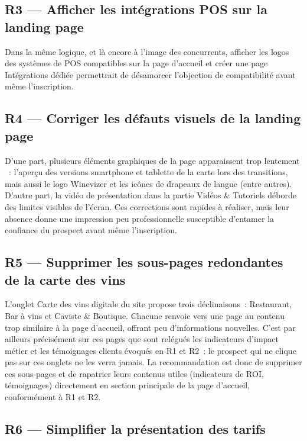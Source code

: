 \documentclass[12pt, a4paper]{article}
\begin{document}
\subsection{R3 — Afficher les intégrations POS sur la landing page}

Dans la même logique, et là encore à l'image des concurrents, afficher les logos des systèmes
de POS compatibles sur la page d'accueil et créer une page \og{}Intégrations\fg{} dédiée
permettrait de désamorcer l'objection de compatibilité avant même l'inscription.

\subsection{R4 — Corriger les défauts visuels de la landing page}

D'une part, plusieurs éléments graphiques de la page apparaissent trop lentement
~: l'aperçu des versions smartphone et tablette de la carte lors des
transitions, mais aussi le logo Winevizer et les icônes de drapeaux de langue (entre autres).
D'autre part, la vidéo de
présentation dans la partie \og{}Vidéos \& Tutoriels\fg{} déborde des limites visibles de l'écran.
Ces corrections sont rapides à réaliser, mais leur absence donne une impression peu
professionnelle 
susceptible d'entamer la confiance du prospect avant même l'inscription.

\subsection{R5 — Supprimer les sous-pages redondantes de la carte des vins}

L'onglet \og{}Carte des vins digitale\fg{} du site propose trois déclinaisons~: \og{}Restaurant\fg{}, \og{}Bar à vins\fg{} et
\og{}Caviste \& Boutique\fg{}. Chacune renvoie vers une page au contenu trop similaire à la page d'accueil,
offrant peu d'informations nouvelles. C'est par ailleurs précisément sur ces pages que sont relégués
les indicateurs d'impact métier et les témoignages clients évoqués en R1 et R2~: le prospect qui ne
clique pas sur ces onglets ne les verra jamais. La recommandation est donc de supprimer ces
sous-pages et de rapatrier leurs contenus utiles (indicateurs de ROI, témoignages) directement
en section principale de la page d'accueil, conformément à R1 et R2.

\subsection{R6 — Simplifier la présentation des tarifs}
\end{document}
